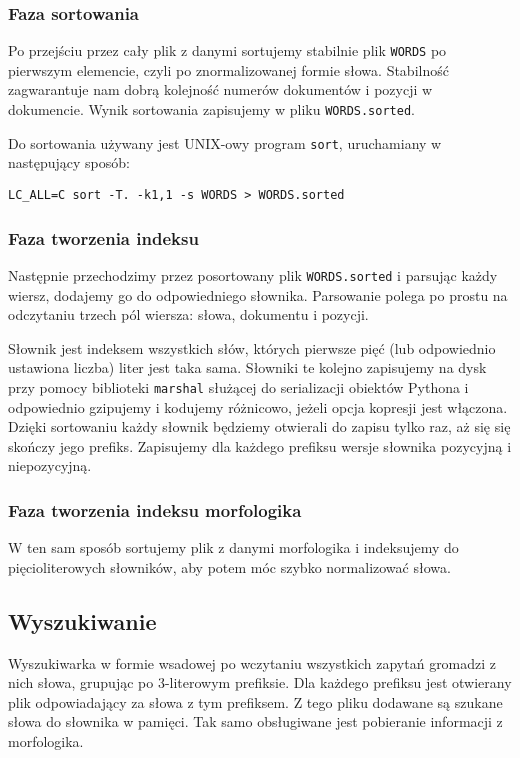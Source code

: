 \documentclass[11pt]{article}
\begin{document}
\subsubsection{Faza sortowania}
Po przejściu przez cały plik z danymi sortujemy stabilnie plik \texttt{WORDS} po pierwszym elemencie, czyli po znormalizowanej formie słowa. Stabilność zagwarantuje nam dobrą kolejność numerów dokumentów i pozycji w dokumencie. Wynik sortowania zapisujemy w pliku \texttt{WORDS.sorted}.

Do sortowania używany jest UNIX-owy program \texttt{sort}, uruchamiany w następujący sposób:
\begin{verbatim}
LC_ALL=C sort -T. -k1,1 -s WORDS > WORDS.sorted
\end{verbatim}

\subsubsection{Faza tworzenia indeksu}
Następnie przechodzimy przez posortowany plik \texttt{WORDS.sorted} i parsując każdy wiersz, dodajemy go do odpowiedniego słownika. Parsowanie polega po prostu na odczytaniu trzech pól wiersza: słowa, dokumentu i pozycji.

Słownik jest indeksem wszystkich słów, których pierwsze pięć (lub odpowiednio ustawiona liczba) liter jest taka sama. Słowniki te kolejno zapisujemy na dysk przy pomocy biblioteki \texttt{marshal} służącej do serializacji obiektów Pythona i odpowiednio gzipujemy i kodujemy różnicowo, jeżeli opcja kopresji jest włączona. Dzięki sortowaniu każdy słownik będziemy otwierali do zapisu tylko raz, aż się się skończy jego prefiks. Zapisujemy dla każdego prefiksu wersje słownika pozycyjną i niepozycyjną.

\subsubsection{Faza tworzenia indeksu morfologika}
W ten sam sposób sortujemy plik z danymi morfologika i indeksujemy do pięcioliterowych słowników, aby potem móc szybko normalizować słowa.

\subsection{Wyszukiwanie}
Wyszukiwarka w formie wsadowej po wczytaniu wszystkich zapytań gromadzi z nich słowa, grupując po 3-literowym prefiksie. Dla każdego prefiksu jest otwierany plik odpowiadający za słowa z tym prefiksem. Z tego pliku dodawane są szukane słowa do słownika w pamięci. Tak samo obsługiwane jest pobieranie informacji z morfologika.
\end{document}
